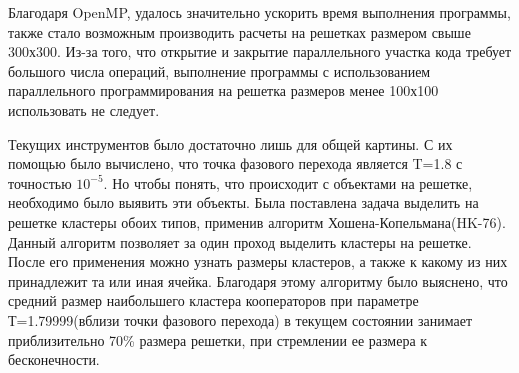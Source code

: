 \documentclass[14pt]{article}
\begin{document}
\par Благодаря OpenMP, удалось значительно ускорить время выполнения программы, также стало возможным производить расчеты на решетках размером свыше 300х300. Из-за того, что открытие и закрытие параллельного участка кода требует большого числа операций, выполнение программы с использованием параллельного программирования на решетка размеров менее 100х100 использовать не следует. 
\par Текущих инструментов было достаточно лишь для общей картины. С их помощью было вычислено, что точка фазового перехода является T=1.8 с точностью $10^{-5}$. Но чтобы понять, что происходит с объектами на решетке, необходимо было выявить эти объекты. Была поставлена задача выделить на решетке кластеры обоих типов, применив алгоритм Хошена-Копельмана(HK-76)\cite{HK}. Данный алгоритм позволяет за один проход выделить кластеры на решетке. После его применения можно узнать размеры кластеров, а также к какому из них принадлежит та или иная ячейка. Благодаря этому алгоритму было выяснено, что средний размер наибольшего кластера кооператоров при параметре Т=1.79999(вблизи точки фазового перехода) в текущем состоянии занимает приблизительно 70\% размера решетки, при стремлении ее размера к бесконечности. 
\end{document}
